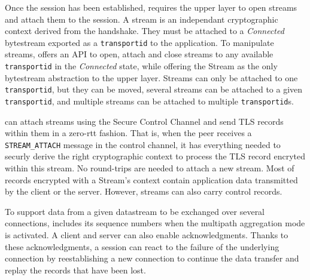 Once the \tcpls session has been established, \tcpls requires the upper layer to
open streams and attach them to the session. A stream is an independant
cryptographic context derived from the \tcpls handshake. They must be attached to a \textit{Connected} \tcp bytestream exported as a \texttt{transportid} to the application. To manipulate streams, \tcpls offers an API to open, attach
and close streams to any available \texttt{transportid} in the \textit{Connected} state, while offering the Stream as the only bytestream abstraction to the upper layer. Streams can only be attached to one \texttt{transportid}, but they can be moved, several streams can be attached to a given \texttt{transportid}, and multiple streams can be attached to multiple \texttt{transportid}s.

\tcpls can attach streams using the Secure Control Channel and send TLS records
within them in a zero-rtt fashion. That is, when the peer receives a
\texttt{STREAM\_ATTACH} message in the control channel, it has everything needed
to securly derive the right cryptographic context to process the TLS record
encryted within this stream. No round-trips are needed to attach a new stream.
Most of records encrypted with a Stream's context contain application data
transmitted by the client or the server. However, streams can also carry control
records.


To support data from a given datastream to be exchanged over several \tcp
connections, \tcpls includes its sequence numbers when the multipath aggregation
mode is activated. A client and server can also enable acknowledgments. Thanks
to these \tcpls acknowledgments, a \tcpls session can react to the failure of
the underlying \tcp connection by reestablishing a new \tcp connection to
continue the data transfer and replay the records that have been lost.

